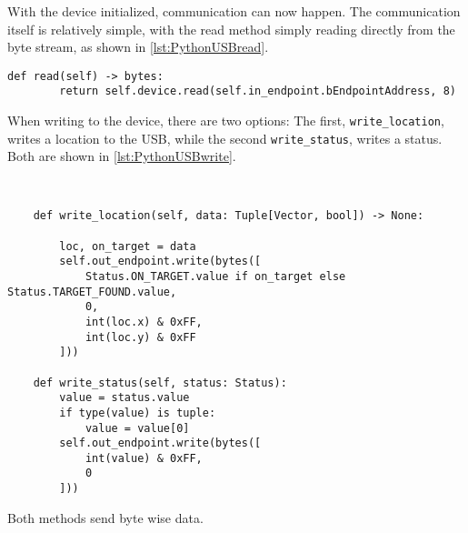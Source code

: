 

With the device initialized, communication can now happen.
The communication itself is relatively simple, with the read method simply reading directly from the byte stream, as shown in \autoref{lst:PythonUSBread}.

\begin{lstlisting}[label={lst:PythonUSBread},caption={Reading from the USB port connected to the NXT}]
	def read(self) -> bytes:
		return self.device.read(self.in_endpoint.bEndpointAddress, 8)
\end{lstlisting}

When writing to the device, there are two options:
The first, \texttt{write\_location}, writes a location to the USB, while the second \texttt{write\_status}, writes a status.
Both are shown in \autoref{lst:PythonUSBwrite}.

\begin{lstlisting}[label={lst:PythonUSBwrite},caption={Writing from the USB port connected to the NXT}]

	
	def write_location(self, data: Tuple[Vector, bool]) -> None:
	
		loc, on_target = data
		self.out_endpoint.write(bytes([
			Status.ON_TARGET.value if on_target else Status.TARGET_FOUND.value,
			0,
			int(loc.x) & 0xFF,
			int(loc.y) & 0xFF
		]))
	
	def write_status(self, status: Status):
		value = status.value
		if type(value) is tuple:
			value = value[0]
		self.out_endpoint.write(bytes([
			int(value) & 0xFF,
			0
		]))

\end{lstlisting}
Both methods send byte wise data.